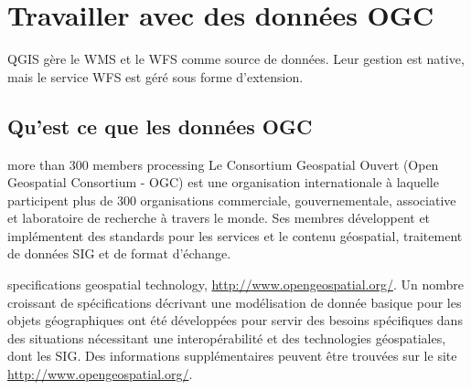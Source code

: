 \section{Travailler avec des donn\'ees OGC}


QGIS g\`ere le WMS et le WFS comme source de donn\'ees. Leur gestion est native, mais
le service WFS  est g\'er\'e sous forme d'extension.

\subsection{Qu'est ce que les donn\'ees OGC}

more than 300 
members 
processing 
Le Consortium Geospatial Ouvert (Open Geospatial Consortium - OGC) est une
organisation internationale \`a laquelle participent plus de 300 organisations
commerciale, gouvernementale, associative et laboratoire de recherche \`a travers 
le monde. Ses membres d\'eveloppent et impl\'ementent des standards pour les 
services et le contenu g\'eospatial, traitement de donn\'ees SIG et de format 
d'\'echange.

specifications 
geospatial technology, 
\url{http://www.opengeospatial.org/}.
Un nombre croissant de sp\'ecifications d\'ecrivant une mod\'elisation de donn\'ee
basique pour les objets g\'eographiques ont \'et\'e d\'evelopp\'ees pour servir des besoins
sp\'ecifiques dans des situations n\'ecessitant une interop\'erabilit\'e et des technologies g\'eospatiales,
dont les SIG. Des informations suppl\'ementaires peuvent \^etre trouv\'ees sur le site
\url{http://www.opengeospatial.org/}.

